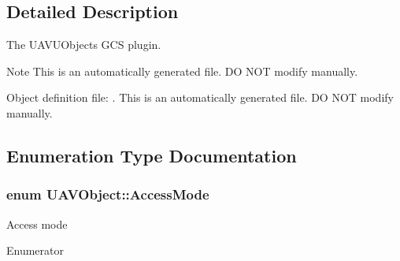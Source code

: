 \subsection{Detailed Description}
The U\-A\-V\-U\-Objects G\-C\-S plugin. \begin{DoxyNote}{Note}
This is an automatically generated file. D\-O N\-O\-T modify manually.

Object definition file\-: . This is an automatically generated file. D\-O N\-O\-T modify manually. 
\end{DoxyNote}


\subsection{Enumeration Type Documentation}
\hypertarget{group___u_a_v_objects_plugin_ga80357a2f38fa4be23200de86614c3d77}{
\subsubsection[{Access\-Mode}]{\setlength{\rightskip}{0pt plus 5cm}enum {\bf U\-A\-V\-Object\-::\-Access\-Mode}}}\label{group___u_a_v_objects_plugin_ga80357a2f38fa4be23200de86614c3d77}
Access mode \begin{Desc}
\item[Enumerator]\par
\begin{description}
\item[{\em 
\hypertarget{group___u_a_v_objects_plugin_gga80357a2f38fa4be23200de86614c3d77ad710c074e7e275da805bf900c9917d47}{A\-C\-C\-E\-S\-S\-\_\-\-R\-E\-A\-D\-W\-R\-I\-T\-E}\label{group___u_a_v_objects_plugin_gga80357a2f38fa4be23200de86614c3d77ad710c074e7e275da805bf900c9917d47}
}]\item[{\em 
\hypertarget{group___u_a_v_objects_plugin_gga80357a2f38fa4be23200de86614c3d77a97e59f527995175cc60e103001470e49}{A\-C\-C\-E\-S\-S\-\_\-\-R\-E\-A\-D\-O\-N\-L\-Y}\label{group___u_a_v_objects_plugin_gga80357a2f38fa4be23200de86614c3d77a97e59f527995175cc60e103001470e49}
}]\end{description}
\end{Desc}


